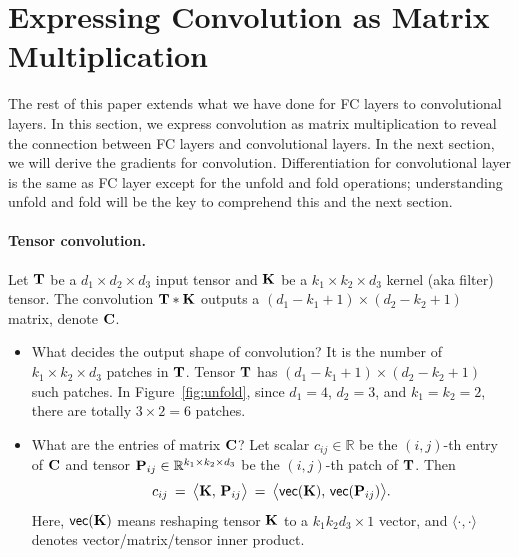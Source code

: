\documentclass[11pt]{article}
\numberwithin{equation}{section}
\def\C{{\bf C}}
\def\K{{\bf K}}
\def\PP{{\bf P}}
\def\T{{\bf T}}
\def\RB{{\mathbb R}}
\def\vect{\mathsf{vec}}
\begin{document}
\section{Expressing Convolution as Matrix Multiplication}

The rest of this paper extends what we have done for FC layers to convolutional layers.
In this section, we express convolution as matrix multiplication to reveal the connection between FC layers and convolutional layers.
In the next section, we will derive the gradients for convolution.
Differentiation for convolutional layer is the same as FC layer except for the \textsf{unfold} and \textsf{fold} operations;
understanding \textsf{unfold} and \textsf{fold} will be the key to comprehend this and the next section.


\paragraph{Tensor convolution.}
Let $\T $ be a $d_1 \times d_2 \times d_3$ input tensor and $\K$ be a $k_1 \times k_2 \times d_3$ kernel (aka filter) tensor.
The convolution $\T * \K $ outputs a $(d_1 - k_1 + 1) \times (d_2 - k_2 + 1)$ matrix, denote $\C$.
\begin{itemize}
    \item 
    What decides the output shape of convolution? It is the number of $k_1 \times k_2 \times d_3$ patches in $\T$.
    Tensor $\T$ has $(d_1 - k_1 + 1) \times (d_2 - k_2 + 1)$ such patches.
    In Figure~\ref{fig:unfold}, since $d_1=4$, $d_2=3$, and $k_1=k_2=2$, there are totally $3\times 2 = 6$ patches.
    \item
    What are the entries of matrix $\C$?
    Let scalar $c_{ij} \in \RB$ be the $(i,j)$-th entry of $\C$ and tensor $\PP_{ij} \in \RB^{k_1 \times k_2 \times d_3}$ be the $(i,j)$-th patch of $\T$.
    Then
    \begin{equation}\label{eq:conv1}
        c_{ij} \: = \: \big\langle \K , \, \PP_{ij} \big\rangle
        \: = \:  \big\langle  \vect (\K) , \, \vect (\PP_{ij} )  \big\rangle .
    \end{equation}
    Here, $\vect (\K) $ means reshaping tensor $\K$ to a $k_1  k_2  d_3 \times 1$ vector, and $\langle \cdot , \cdot \rangle$ denotes vector/matrix/tensor inner product.
\end{itemize}
\end{document}
